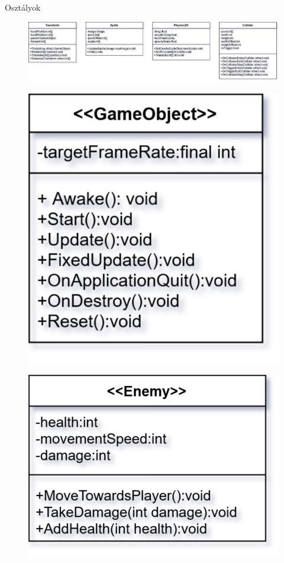 \documentclass[14pt, aspectratio=169]{beamer}
\begin{document}
	\begin{frame}{Osztályok}
		\only<1>
		{
			\begin{figure}
				\centering
    			\includegraphics[height = 0.4\textheight]{Tulajdonsagok.png}
			\end{figure}
		}
		{
			\begin{figure}
				\centering
    			\includegraphics[height = 0.8\textheight]{GameObject.png}
			\end{figure}
		}
		{
			\begin{figure}
				\centering
    			\includegraphics[height = 0.8\textheight]{Enemy.png}

\end{figure}}
\end{frame}
\end{document}
